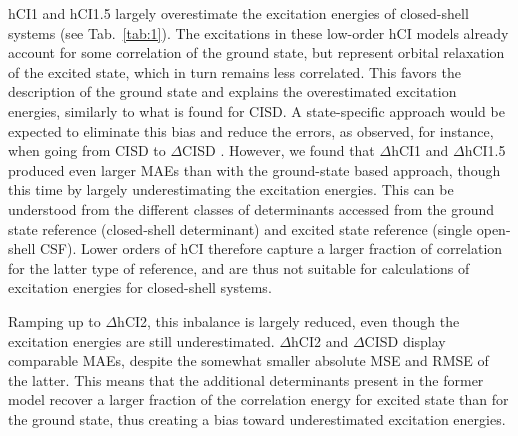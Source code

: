 \documentclass[aip,jcp,reprint,noshowkeys,superscriptaddress]{revtex4-1}
\begin{document}
hCI1 and hCI1.5 largely overestimate the excitation energies of closed-shell systems (see Tab.~\ref{tab:1}).
The excitations in these low-order hCI models already account for some correlation of the ground state, but represent orbital relaxation of the excited state, which in turn remains less correlated.
This favors the description of the ground state and explains the overestimated excitation energies, similarly to what is found for CISD. \cite{}
A state-specific approach would be expected to eliminate this bias and reduce the errors, as observed, for instance, when going from CISD to $\Delta$CISD \cite{Kossoski_2023}.
However, we found that $\Delta$hCI1 and $\Delta$hCI1.5 produced even larger MAEs than with the ground-state based approach, though this time by largely underestimating the excitation energies.
This can be understood from the different classes of determinants accessed from the ground state reference (closed-shell determinant) and excited state reference (single open-shell CSF).
Lower orders of hCI therefore capture a larger fraction of correlation for the latter type of reference, and are thus not suitable for calculations of excitation energies for closed-shell systems.

Ramping up to $\Delta$hCI2, this inbalance is largely reduced, even though the excitation energies are still underestimated.
$\Delta$hCI2 and $\Delta$CISD display comparable MAEs, despite the somewhat smaller absolute MSE and RMSE of the latter.
This means that the additional determinants present in the former model recover a larger fraction of the correlation energy for excited state than for the ground state, thus creating a bias toward underestimated excitation energies.

\end{document}

